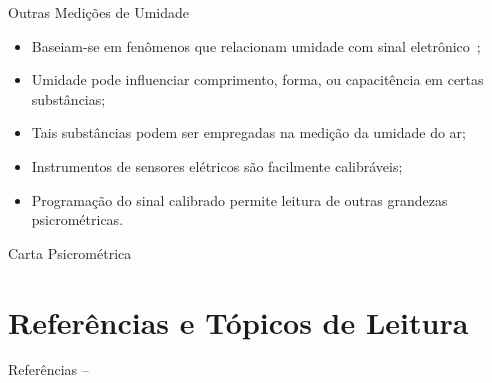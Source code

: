     \begin{frame}{Outras Medições de Umidade}\vspace*{-0em}
        \begin{itemize}
            \item<1-> Baseiam-se em fenômenos que relacionam umidade com \alert{sinal
                eletrônico}~\cite{1985-WylenG-Wiley};
                \\[\medskipamount]
            \item<2-> Umidade pode influenciar \alert{comprimento}, \alert{forma}, ou
                \alert{capacitência} em certas substâncias;
                \\[\medskipamount]
            \item<3-> Tais substâncias podem ser empregadas na \alert{medição da umidade do ar};
                \\[\medskipamount]
            \item<4-> Instrumentos de sensores elétricos são \alert{facilmente calibráveis};
                \\[\medskipamount]
            \item<5-> Programação do sinal calibrado permite leitura de \alert{outras grandezas}
                psicrométricas.
        \end{itemize}
    \end{frame}

    \begin{frame}{Carta Psicrométrica}
    \end{frame}

\section{Referências e Tópicos de Leitura}

    \begin{frame}[allowframebreaks]{Referências -- }
        
        
    \end{frame}

